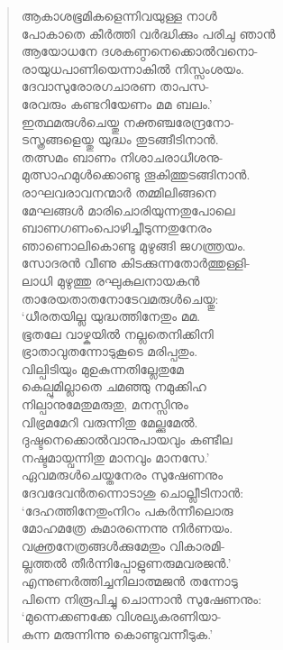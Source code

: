 \begin{verse}
ആകാശഭൂമികളെന്നിവയുള്ള നാള്‍\\
പോകാതെ കീര്‍ത്തി വര്‍ദ്ധിക്കും പരിചു ഞാന്‍\\
ആയോധനേ ദശകണ്ഠനെക്കൊല്‍വനൊ-\\
രായുധപാണിയെന്നാകില്‍ നിസ്സംശയം.\\
ദേവാസുരോരഗചാരണ താപസ-\\
രേവരും കണ്ടറിയേണം മമ ബലം.’\\
ഇത്ഥമരുള്‍ചെയ്തു നക്തഞ്ചരേന്ദ്രനോ-\\
ടസ്ത്രങ്ങളെയ്തു യുദ്ധം തുടങ്ങീടിനാന്‍.\\
തത്സമം ബാണം നിശാചരാധീശനു-\\
മുത്സാഹമുള്‍ക്കൊണ്ടു തൂകിത്തുടങ്ങിനാന്‍.\\
രാഘവരാവനന്മാര്‍ തമ്മിലിങ്ങനെ\\
മേഘങ്ങള്‍ മാരിചൊരിയുന്നതുപോലെ\\
ബാണഗണംപൊഴിച്ചീടുന്നതുനേരം\\
ഞാണൊലികൊണ്ടു മുഴുങ്ങി ജഗത്ത്രയം.\\
സോദരന്‍ വീണു കിടക്കുന്നതോര്‍ത്തുള്ളി-\\
ലാധി മുഴുത്തു രഘുകുലനായകന്‍\\
താരേയതാതനോടേവമരുള്‍ചെയ്തു:\\
‘ധീരതയില്ല യുദ്ധത്തിനേതും മമ.\\
ഭൂതലേ വാഴ്കയില്‍ നല്ലതെനിക്കിനി\\
ഭ്രാതാവുതന്നോടുകൂടെ മരിപ്പതും.\\
വില്പിടിയും മുഉകുന്നതില്ലേതുമേ\\
കെല്പുമില്ലാതെ ചമഞ്ഞു നമുക്കിഹ\\
നില്പാനുമേതുമരുതു, മനസ്സിനും\\
വിഭ്രമമേറി വരുന്നിതു മേല്ക്കുമേല്‍.\\
ദുഷ്ടനെക്കൊല്‍വാനുപായവും കണ്ടീല\\
നഷ്ടമായ്വന്നിതു മാനവും മാനസേ.’\\
ഏവമരുള്‍ചെയ്തനേരം സുഷേണനും\\
ദേവദേവന്‍തന്നൊടാശു ചൊല്ലീടിനാന്‍:\\
‘ദേഹത്തിനേതുംനിറം പകര്‍ന്നീലൊരു\\
മോഹമത്രേ കുമാരന്നെന്നു നിര്‍ണയം.\\
വക്ത്രനേത്രങ്ങള്‍ക്കുമേതും വികാരമി-\\
ല്ലത്തല്‍ തീര്‍ന്നിപ്പോളുണരുമവരജന്‍.’\\
എന്നുണര്‍ത്തിച്ചനിലാത്മജന്‍ തന്നോടു\\
പിന്നെ നിരൂപിച്ചു ചൊന്നാന്‍ സുഷേണനും:\\
‘മുന്നെക്കണക്കേ വിശല്യകരണിയാ-\\
കുന്ന മരുന്നിന്നു കൊണ്ടുവന്നീടുക.’\\

\end{verse}
